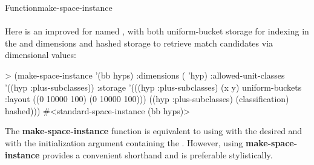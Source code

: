 \documentclass[10pt,twoside,english,pdftex]{article}
\begin{document}
\begin{functiondoc}{Function}{make-space-instance}{
      \\ 
      \\
    \returns{} }
Here is an improved  for 
 named , with both uniform-bucket storage for
indexing in the  and  dimensions and hashed storage to
retrieve match candidates via  dimensional values:
%
\W\supp
\begin{example}
> (make-space-instance '(bb hyps)
     :dimensions ( 'hyp)
     :allowed-unit-classes '((hyp :plus-subclasses))
     :storage '(((hyp :plus-subclasses) (x y) 
                 uniform-buckets :layout ((0 10000 100)
                                          (0 10000 100)))
                ((hyp :plus-subclasses) (classification) 
                 hashed)))
#<standard-space-instance (bb hyps)>
\end{example}

\fnnote The \textbf{make-space-instance} function is equivalent to using
\textbf{} with the desired  and
with the initialization argument  containing the
.  However, using \textbf{make-space-instance}
provides a convenient shorthand and is preferable stylistically.

\end{functiondoc}

\end{document}
